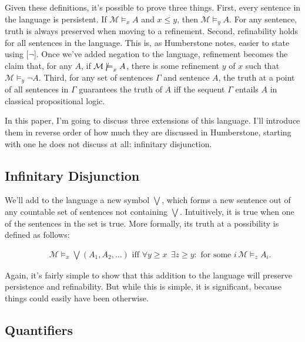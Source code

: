 \documentclass[
  11pt,
  letterpaper,
  DIV=11,
  numbers=noendperiod,
  twoside]{scrartcl}
\newcommand{\nmodels}{\mathrel{\ooalign{$\models$\cr\raisebox{-0.001ex}{\hss$\mkern-1mu/\hss$}\cr}}}
\begin{document}
Given these definitions, it's possible to prove three things. First,
every sentence in the language is persistent. If
\(\mathcal{M} \models_x A\) and \(x \leqslant y\), then
\(\mathcal{M} \models_y A\). For any sentence, truth is always preserved
when moving to a refinement. Second, refinability holds for all
sentences in the language. This is, as Humberstone notes, easier to
state using {[}\(\neg\){]}. Once we've added negation to the language,
refinement becomes the claim that, for any \(A\), if
\(\mathcal{M} \nmodels_x A\), there is some refinement \(y\) of \(x\)
such that \(\mathcal{M} \models_y \neg A\). Third, for any set of
sentences \(\Gamma\) and sentence \(A\), the truth at a point of all
sentences in \(\Gamma\) guarantees the truth of \(A\) iff the sequent
\(\Gamma\) entails \(A\) in classical propositional logic.

In this paper, I'm going to discuss three extensions of this language.
I'll introduce them in reverse order of how much they are discussed in
Humberstone, starting with one he does not discuss at all: infinitary
disjunction.

\subsection*{Infinitary Disjunction}\label{infinitary-disjunction}

We'll add to the language a new symbol \(\bigvee\), which forms a new
sentence out of any countable set of sentences not containing
\(\bigvee\). Intuitively, it is true when one of the sentences in the
set is true. More formally, its truth at a possibility is defined as
follows:

\begin{align*}
[\bigvee] \quad & \mathcal{M} \models_x \bigvee ({A_1, A_2, \dots})  \text{ iff } \forall y \geqslant x \;\, \exists z \geqslant y :\text{ for some } i \, \mathcal{M} \models_z A_i.
\end{align*}

Again, it's fairly simple to show that this addition to the language
will preserve persistence and refinability. But while this is simple, it
is significant, because things could easily have been otherwise.

\subsection*{Quantifiers}\label{quantifiers}
\end{document}
